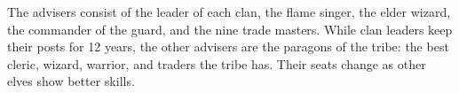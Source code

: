 The advisers consist of the leader of each clan, the flame singer, the elder wizard, the commander of the guard, and the nine trade masters. While clan leaders keep their posts for 12 years, the other advisers are the paragons of the tribe: the best cleric, wizard, warrior, and traders the tribe has. Their seats change as other elves show better skills.
